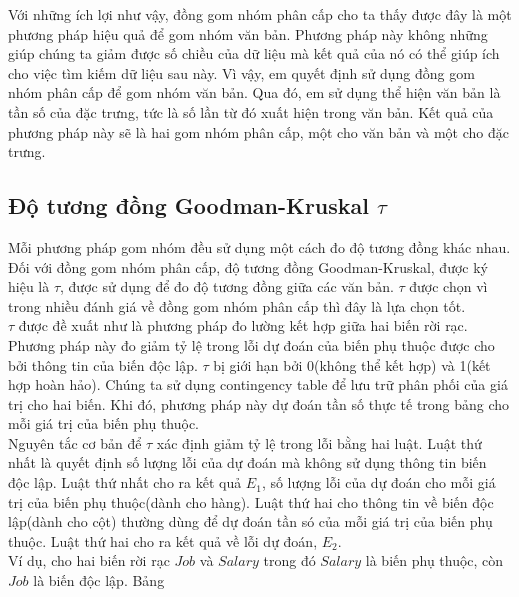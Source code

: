 \hspace*{10mm}Với những ích lợi như vậy, đồng gom nhóm phân cấp cho ta thấy được đây là một phương pháp hiệu quả để gom nhóm văn bản. Phương pháp này không những giúp chúng ta giảm được số chiều của dữ liệu mà kết quả của nó có thể giúp ích cho việc tìm kiếm dữ liệu sau này. Vì vậy, em quyết định sử dụng đồng gom nhóm phân cấp để gom nhóm văn bản. Qua đó, em sử dụng thể hiện văn bản là tần số của đặc trưng, tức là số lần từ đó xuất hiện trong văn bản. Kết quả của phương pháp này sẽ là hai gom nhóm phân cấp, một cho văn bản và một cho đặc trưng. \\

\subsection{Độ tương đồng Goodman-Kruskal $\tau$}
\noindent
\hspace{10mm}Mỗi phương pháp gom nhóm đều sử dụng một cách đo độ tương đồng khác nhau. Đối với đồng gom nhóm phân cấp, độ tương đồng Goodman-Kruskal, được ký hiệu là $\tau$, được sử dụng để đo độ tương đồng giữa các văn bản. $\tau$ được chọn vì trong nhiều đánh giá về đồng gom nhóm phân cấp thì đây là lựa chọn tốt.\\

\hspace*{10mm}$\tau$ được đề xuất như là phương pháp đo lường kết hợp giữa hai biến rời rạc. Phương pháp này đo giảm tỷ lệ trong lỗi dự đoán của biến phụ thuộc được cho bởi thông tin của biến độc lập. $\tau$ bị giới hạn bởi 0(không thể kết hợp) và 1(kết hợp hoàn hảo).
Chúng ta sử dụng contingency table để lưu trữ phân phối của giá trị cho hai biến. Khi đó, phương pháp này dự đoán tần số thực tế trong bảng cho mỗi giá trị của biến phụ thuộc.\\

\hspace*{10mm}Nguyên tắc cơ bản để $\tau$ xác định giảm tỷ lệ trong lỗi bằng hai luật. Luật thứ nhất là quyết định số lượng lỗi của dự đoán mà không sử dụng thông tin biến độc lập. Luật thứ nhất cho ra kết quả $E_1$, số lượng lỗi của dự đoán cho mỗi giá trị của biến phụ thuộc(dành cho hàng). Luật thứ hai cho thông tin về biến độc lập(dành cho cột) thường dùng để dự đoán tần só của mỗi giá trị của biến phụ thuộc. Luật thứ hai cho ra kết quả về lỗi dự đoán, $E_2$.\\

\hspace*{10mm}Ví dụ, cho hai biến rời rạc $Job$ và $Salary$ trong đó $Salary$ là biến phụ thuộc, còn $Job$ là biến độc lập. Bảng
\begin{table}[ht]
\begin{center}
\begin{tabular}{c c c c c c}

\end{tabular}
\end{center}
\end{table}

